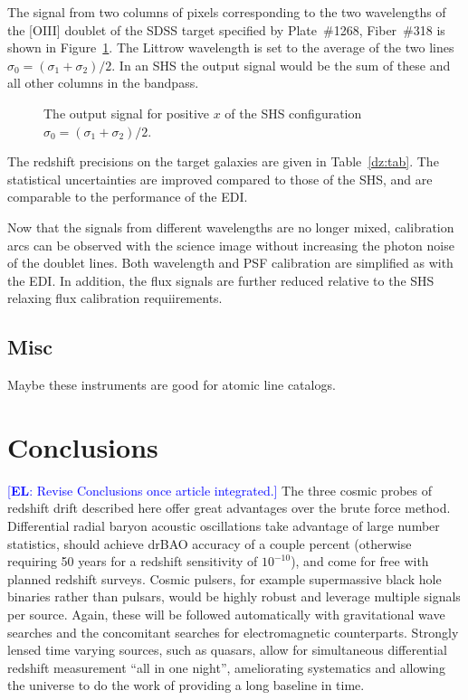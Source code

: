 \documentclass[preprint]{aastex}
\newcommand{\eric}[1]{\textcolor{blue}{[{\bf EL}: #1]}}
\begin{document}
The signal from two columns of pixels corresponding to the two wavelengths of
the [OIII] doublet of the
SDSS target specified by Plate~\#1268, Fiber~\#318 is shown in Figure~\ref{edshs:fig}.
The Littrow wavelength is set to the average of the two lines  $\sigma_0=(\sigma_1+\sigma_2)/2$.
In an SHS the output signal would be the sum of these and all other columns in the bandpass.


\begin{figure}[t]
   \centering
   \caption{The output signal for positive $x$ of the  SHS configuration
    $\sigma_0=(\sigma_1+\sigma_2)/2$. \label{edshs:fig}}
\end{figure}

The redshift precisions on the target galaxies are given in Table~\ref{dz:tab}.  The statistical uncertainties are improved compared to those of the
SHS, and are comparable to the performance of the EDI.

Now that the signals from different wavelengths are no longer mixed, calibration arcs can be observed with the science image without increasing
the photon noise of the doublet lines.  Both wavelength and PSF calibration are simplified as with the EDI.
In addition, the flux signals are further reduced relative to the SHS relaxing flux calibration requiirements.


\subsection{Misc}
Maybe these instruments are good for atomic line catalogs.




\section{Conclusions} \label{sec:concl} 

\eric{Revise Conclusions once article integrated.} 
The three cosmic probes of redshift drift described here offer great 
advantages over the brute force method.  Differential radial baryon acoustic 
oscillations take advantage of large number statistics, should achieve drBAO 
accuracy of a couple percent (otherwise requiring 50 years for a redshift 
sensitivity of $10^{-10}$), and come for free with planned redshift surveys. 
Cosmic pulsers, for example supermassive black hole binaries rather than 
pulsars, would be highly robust and leverage multiple signals per source.  
Again, these will be followed automatically with gravitational wave 
searches and the concomitant searches for electromagnetic counterparts.  
Strongly lensed time varying sources, such as quasars, allow for simultaneous 
differential redshift measurement ``all in one night'', ameliorating 
systematics and allowing the universe to do the work of providing a long 
baseline in time.  
\end{document}
